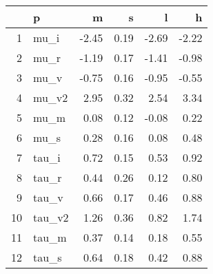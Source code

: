 \begin{table}[ht]
\centering
\begin{tabular}{rlrrrr}
  \hline
 & p & m & s & l & h \\ 
  \hline
1 & mu\_i & -2.45 & 0.19 & -2.69 & -2.22 \\ 
  2 & mu\_r & -1.19 & 0.17 & -1.41 & -0.98 \\ 
  3 & mu\_v & -0.75 & 0.16 & -0.95 & -0.55 \\ 
  4 & mu\_v2 & 2.95 & 0.32 & 2.54 & 3.34 \\ 
  5 & mu\_m & 0.08 & 0.12 & -0.08 & 0.22 \\ 
  6 & mu\_s & 0.28 & 0.16 & 0.08 & 0.48 \\ 
  7 & tau\_i & 0.72 & 0.15 & 0.53 & 0.92 \\ 
  8 & tau\_r & 0.44 & 0.26 & 0.12 & 0.80 \\ 
  9 & tau\_v & 0.66 & 0.17 & 0.46 & 0.88 \\ 
  10 & tau\_v2 & 1.26 & 0.36 & 0.82 & 1.74 \\ 
  11 & tau\_m & 0.37 & 0.14 & 0.18 & 0.55 \\ 
  12 & tau\_s & 0.64 & 0.18 & 0.42 & 0.88 \\ 
   \hline
\end{tabular}
\label{tab:param}
\end{table}
